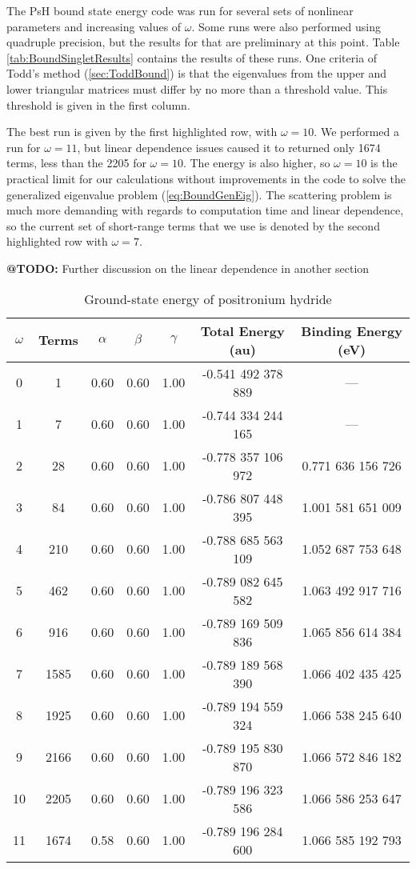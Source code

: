\documentclass[Dissertation.tex]{subfiles}
\begin{document}
The PsH bound state energy code was run for several sets of nonlinear parameters and increasing values of $\omega$.  Some runs were also performed using quadruple precision, but the results for that are preliminary at this point.  Table \ref{tab:BoundSingletResults} contains the results of these runs.  One criteria of Todd's method (\ref{sec:ToddBound}) is that the eigenvalues from the upper and lower triangular matrices must differ by no more than a threshold value.  This threshold is given in the first column.

The best run is given by the first highlighted row, with $\omega = 10$.  We performed a run for $\omega = 11$, but linear dependence issues caused it to returned only 1674 terms, less than the 2205 for $\omega = 10$.  The energy is also higher, so $\omega = 10$ is the practical limit for our calculations without improvements in the code to solve the generalized eigenvalue problem (\ref{eq:BoundGenEig}).  The scattering problem is much more demanding with regards to computation time and linear dependence, so the current set of short-range terms that we use is denoted by the second highlighted row with $\omega = 7$.  

\textbf{@TODO:} Further discussion on the linear dependence in another section


\setlength{\abovecaptionskip}{6pt}   %
\setlength{\belowcaptionskip}{6pt}   %
\begin{table}[H]
\centering
\begin{tabular}{c c c c c c c}
\toprule
$\omega$ & Terms & $\alpha$ & $\beta$ & $\gamma$ & Total Energy (au) & Binding Energy (eV) \\ [0.5ex]
\midrule
0 & 1 & 0.60 & 0.60 & 1.00 & -0.541 492 378 889 & --- \\
1 & 7 & 0.60 & 0.60 & 1.00 & -0.744 334 244 165 & --- \\
2 & 28 & 0.60 & 0.60 & 1.00 & -0.778 357 106 972 & 0.771 636 156 726 \\
3 & 84 & 0.60 & 0.60 & 1.00 & -0.786 807 448 395 & 1.001 581 651 009 \\
4 & 210 & 0.60 & 0.60 & 1.00 & -0.788 685 563 109 & 1.052 687 753 648 \\
5 & 462 & 0.60 & 0.60 & 1.00 & -0.789 082 645 582 & 1.063 492 917 716 \\
6 & 916 & 0.60 & 0.60 & 1.00 & -0.789 169 509 836 & 1.065 856 614 384 \\
7 & 1585 & 0.60 & 0.60 & 1.00 & -0.789 189 568 390 & 1.066 402 435 425 \\
8 & 1925 & 0.60 & 0.60 & 1.00 & -0.789 194 559 324 & 1.066 538 245 640 \\
9 & 2166 & 0.60 & 0.60 & 1.00 & -0.789 195 830 870 & 1.066 572 846 182 \\
10 & 2205 & 0.60 & 0.60 & 1.00 & -0.789 196 323 586 & 1.066 586 253 647 \\
11 & 1674 & 0.58 & 0.60 & 1.00 & -0.789 196 284 600 & 1.066 585 192 793 \\
\bottomrule
\end{tabular}
\caption{Ground-state energy of positronium hydride} %
\label{tab:BoundEnergy1}
\end{table}
\end{document}
